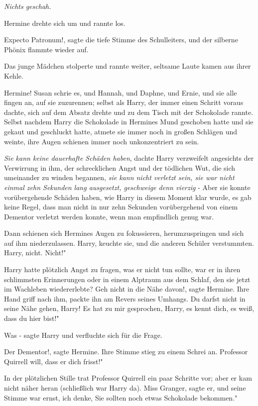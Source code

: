 \emph{ Nichts geschah.}

Hermine drehte sich um und rannte los.

\glqq Expecto Patronum!\grqq{}, sagte die tiefe Stimme des Schulleiters, und der
silberne Phönix flammte wieder auf.

Das junge Mädchen stolperte und rannte weiter, seltsame Laute kamen aus ihrer
Kehle.

\glqq Hermine!\grqq{} Susan schrie es, und Hannah, und Daphne, und Ernie, und
sie alle fingen an, auf sie zuzurennen; selbst als Harry, der immer einen
Schritt voraus dachte, sich auf dem Absatz drehte und zu dem Tisch mit der
Schokolade rannte. Selbst nachdem Harry die Schokolade in Hermines Mund
geschoben hatte und sie gekaut und geschluckt hatte, atmete sie immer noch in
großen Schlägen und weinte, ihre Augen schienen immer noch unkonzentriert zu
sein.

\emph{ Sie kann keine dauerhafte Schäden haben}, dachte Harry verzweifelt
angesichts der Verwirrung in ihm, der schrecklichen Angst und der tödlichen Wut,
die sich umeinander zu winden begannen,\emph{ sie kann nicht verletzt sein, sie
war nicht einmal zehn Sekunden lang ausgesetzt, geschweige denn vierzig }- Aber
sie konnte vorübergehende Schäden haben, wie Harry in diesem Moment klar wurde,
es gab keine Regel, dass man nicht in nur zehn Sekunden vorübergehend von einem
Dementor verletzt werden konnte, wenn man empfindlich genug war.

Dann schienen sich Hermines Augen zu fokussieren, herumzuspringen und sich auf
ihm niederzulassen. \glqq Harry\grqq{}, keuchte sie, und die anderen Schüler
verstummten. \glqq Harry, nicht. Nicht!"

Harry hatte plötzlich Angst zu fragen, was er nicht tun sollte, war er in ihren
schlimmsten Erinnerungen oder in einem Alptraum aus dem Schlaf, den sie jetzt im
Wachleben wiedererlebte? \glqq Geh nicht in die Nähe davon!\grqq{}, sagte
Hermine. Ihre Hand griff nach ihm, packte ihn am Revers seines Umhangs. \glqq Du
darfst nicht in seine Nähe gehen, Harry! Es hat zu mir gesprochen, Harry, es
kennt dich, es weiß, dass du hier bist!"

\glqq Was -\grqq{} sagte Harry und verfluchte sich für die Frage.

\glqq Der Dementor!\grqq{}, sagte Hermine. Ihre Stimme stieg zu einem Schrei an.
\glqq Professor Quirrell will, dass er dich frisst!"

In der plötzlichen Stille trat Professor Quirrell ein paar Schritte vor; aber er
kam nicht näher heran (schließlich war Harry da). \glqq Miss Granger\grqq{},
sagte er, und seine Stimme war ernst, \glqq ich denke, Sie sollten noch etwas
Schokolade bekommen."

